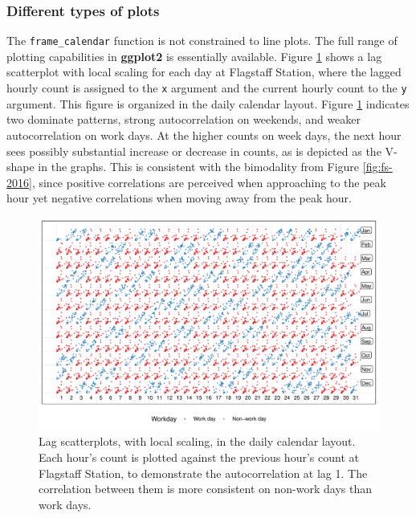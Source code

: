 \documentclass[12pt]{article}
\begin{document}
\hypertarget{different-types-of-plots}{%
\subsubsection{Different types of plots}\label{different-types-of-plots}}

The \texttt{frame\_calendar} function is not constrained to line plots. The full range of plotting capabilities in \textbf{ggplot2} is essentially available. Figure \ref{fig:scatterplot} shows a lag scatterplot with local scaling for each day at Flagstaff Station, where the lagged hourly count is assigned to the \texttt{x} argument and the current hourly count to the \texttt{y} argument. This figure is organized in the daily calendar layout. Figure \ref{fig:scatterplot} indicates two dominate patterns, strong autocorrelation on weekends, and weaker autocorrelation on work days. At the higher counts on week days, the next hour sees possibly substantial increase or decrease in counts, as is depicted as the V-shape in the graphs. This is consistent with the bimodality from Figure \ref{fig:fs-2016}, since positive correlations are perceived when approaching to the peak hour yet negative correlations when moving away from the peak hour.

\begin{figure}

{\centering \includegraphics[width=\textwidth]{figure/scatterplot-1} 

}

\caption{Lag scatterplots, with local scaling, in the daily calendar layout. Each hour's count is plotted against the previous hour's count at Flagstaff Station, to demonstrate the autocorrelation at lag 1. The correlation between them is more consistent on non-work days than work days.}\label{fig:scatterplot}
\end{figure}
\end{document}
